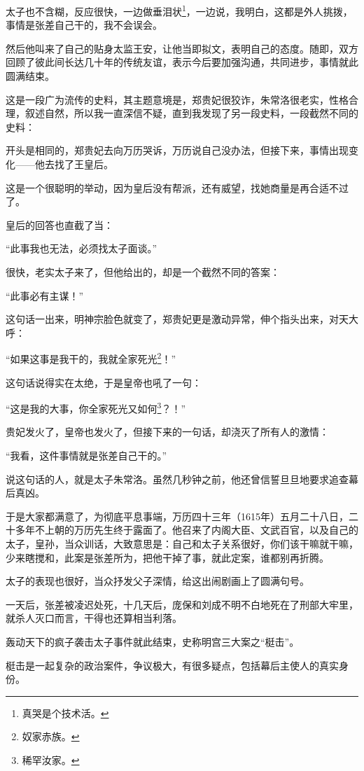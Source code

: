 \begin{multicols}{\theparacolNo}
太子也不含糊，反应很快，一边做垂泪状\footnote{真哭是个技术活。}，一边说，我明白，这都是外人挑拨，事情是张差自己干的，我不会误会。

然后他叫来了自己的贴身太监王安，让他当即拟文，表明自己的态度。随即，双方回顾了彼此间长达几十年的传统友谊，表示今后要加强沟通，共同进步，事情就此圆满结束。

这是一段广为流传的史料，其主题意境是，郑贵妃很狡诈，朱常洛很老实，性格合理，叙述自然，所以我一直深信不疑，直到我发现了另一段史料，一段截然不同的史料：

开头是相同的，郑贵妃去向万历哭诉，万历说自己没办法，但接下来，事情出现变化——他去找了王皇后。

这是一个很聪明的举动，因为皇后没有帮派，还有威望，找她商量是再合适不过了。

皇后的回答也直截了当：

“此事我也无法，必须找太子面谈。”

很快，老实太子来了，但他给出的，却是一个截然不同的答案：

“此事必有主谋！”

这句话一出来，明神宗脸色就变了，郑贵妃更是激动异常，伸个指头出来，对天大呼：

“如果这事是我干的，我就全家死光\footnote{奴家赤族。}！”

这句话说得实在太绝，于是皇帝也吼了一句：

“这是我的大事，你全家死光又如何\footnote{稀罕汝家。}？！”

贵妃发火了，皇帝也发火了，但接下来的一句话，却浇灭了所有人的激情：

“我看，这件事情就是张差自己干的。”

说这句话的人，就是太子朱常洛。虽然几秒钟之前，他还曾信誓旦旦地要求追查幕后真凶。

于是大家都满意了，为彻底平息事端，万历四十三年（1615年）五月二十八日，二十多年不上朝的万历先生终于露面了。他召来了内阁大臣、文武百官，以及自己的太子，皇孙，当众训话，大致意思是：自己和太子关系很好，你们该干嘛就干嘛，少来瞎搅和，此案是张差所为，把他干掉了事，就此定案，谁都别再折腾。

太子的表现也很好，当众抒发父子深情，给这出闹剧画上了圆满句号。

一天后，张差被凌迟处死，十几天后，庞保和刘成不明不白地死在了刑部大牢里，就杀人灭口而言，干得也还算相当利落。

轰动天下的疯子袭击太子事件就此结束，史称明宫三大案之“梃击”。

梃击是一起复杂的政治案件，争议极大，有很多疑点，包括幕后主使人的真实身份。


\end{multicols}
